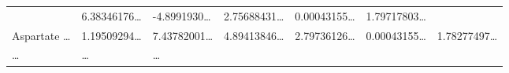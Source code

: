 \documentclass[
]{article}
\begin{document}
\begin{longtable}[]{@{}lllllll@{}}
\begin{minipage}[t]{0.12\columnwidth}
\end{minipage} & \begin{minipage}[t]{0.12\columnwidth}\raggedright
6.38346176\ldots{}\strut
\end{minipage} & \begin{minipage}[t]{0.12\columnwidth}\raggedright
-4.8991930\ldots{}\strut
\end{minipage} & \begin{minipage}[t]{0.12\columnwidth}\raggedright
2.75688431\ldots{}\strut
\end{minipage} & \begin{minipage}[t]{0.12\columnwidth}\raggedright
0.00043155\ldots{}\strut
\end{minipage} & \begin{minipage}[t]{0.12\columnwidth}\raggedright
1.79717803\ldots{}\strut
\end{minipage}\tabularnewline
\begin{minipage}[t]{0.12\columnwidth}\raggedright
Aspartate \ldots{}\strut
\end{minipage} & \begin{minipage}[t]{0.12\columnwidth}\raggedright
1.19509294\ldots{}\strut
\end{minipage} & \begin{minipage}[t]{0.12\columnwidth}\raggedright
7.43782001\ldots{}\strut
\end{minipage} & \begin{minipage}[t]{0.12\columnwidth}\raggedright
4.89413846\ldots{}\strut
\end{minipage} & \begin{minipage}[t]{0.12\columnwidth}\raggedright
2.79736126\ldots{}\strut
\end{minipage} & \begin{minipage}[t]{0.12\columnwidth}\raggedright
0.00043155\ldots{}\strut
\end{minipage} & \begin{minipage}[t]{0.12\columnwidth}\raggedright
1.78277497\ldots{}\strut
\end{minipage}\tabularnewline
\begin{minipage}[t]{0.12\columnwidth}\raggedright
\ldots{}\strut
\end{minipage} & \begin{minipage}[t]{0.12\columnwidth}\raggedright
\ldots{}\strut
\end{minipage} & \begin{minipage}[t]{0.12\columnwidth}\raggedright
\ldots{}\strut
\end{minipage} & \begin{minipage}[t]{0.12\columnwidth}\raggedright

\end{minipage}
\end{longtable}
\end{document}
